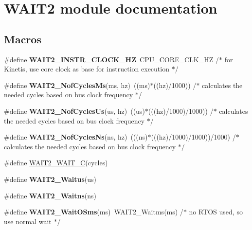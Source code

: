 \hypertarget{group___w_a_i_t2__module}{\section{W\-A\-I\-T2 module documentation}
\label{group___w_a_i_t2__module}
}
\subsection*{Macros}
\begin{DoxyCompactItemize}
\item 
\hypertarget{group___w_a_i_t2__module_ga42be87062ba4bee82e74182008e6afbc}{\#define {\bfseries W\-A\-I\-T2\-\_\-\-I\-N\-S\-T\-R\-\_\-\-C\-L\-O\-C\-K\-\_\-\-H\-Z}~C\-P\-U\-\_\-\-C\-O\-R\-E\-\_\-\-C\-L\-K\-\_\-\-H\-Z /$\ast$ for Kinetis, use core clock as base for instruction execution $\ast$/}\label{group___w_a_i_t2__module_ga42be87062ba4bee82e74182008e6afbc}

\item 
\hypertarget{group___w_a_i_t2__module_gaf13a8ab79ece3a554abaaff60399e8c8}{\#define {\bfseries W\-A\-I\-T2\-\_\-\-Nof\-Cycles\-Ms}(ms, hz)~((ms)$\ast$((hz)/1000)) /$\ast$ calculates the needed cycles based on bus clock frequency $\ast$/}\label{group___w_a_i_t2__module_gaf13a8ab79ece3a554abaaff60399e8c8}

\item 
\hypertarget{group___w_a_i_t2__module_gaea93c12588315526fa7ebe7c305ea8f0}{\#define {\bfseries W\-A\-I\-T2\-\_\-\-Nof\-Cycles\-Us}(us, hz)~((us)$\ast$(((hz)/1000)/1000)) /$\ast$ calculates the needed cycles based on bus clock frequency $\ast$/}\label{group___w_a_i_t2__module_gaea93c12588315526fa7ebe7c305ea8f0}

\item 
\hypertarget{group___w_a_i_t2__module_gacbc1ee8c0a39d4fab8af0efd19fe798f}{\#define {\bfseries W\-A\-I\-T2\-\_\-\-Nof\-Cycles\-Ns}(ns, hz)~(((ns)$\ast$(((hz)/1000)/1000))/1000) /$\ast$ calculates the needed cycles based on bus clock frequency $\ast$/}\label{group___w_a_i_t2__module_gacbc1ee8c0a39d4fab8af0efd19fe798f}

\item 
\#define \hyperlink{group___w_a_i_t2__module_ga79daf93af3a325f56dfa4c24c325c03f}{W\-A\-I\-T2\-\_\-\-W\-A\-I\-T\-\_\-\-C}(cycles)
\item 
\#define {\bfseries W\-A\-I\-T2\-\_\-\-Waitus}(us)
\item 
\#define {\bfseries W\-A\-I\-T2\-\_\-\-Waitns}(ns)
\item 
\hypertarget{group___w_a_i_t2__module_gadcb672b21de6ee7a7239a4ec1372474b}{\#define {\bfseries W\-A\-I\-T2\-\_\-\-Wait\-O\-Sms}(ms)~W\-A\-I\-T2\-\_\-\-Waitms(ms) /$\ast$ no R\-T\-O\-S used, so use normal wait $\ast$/}\label{group___w_a_i_t2__module_gadcb672b21de6ee7a7239a4ec1372474b}

\end{DoxyCompactItemize}
